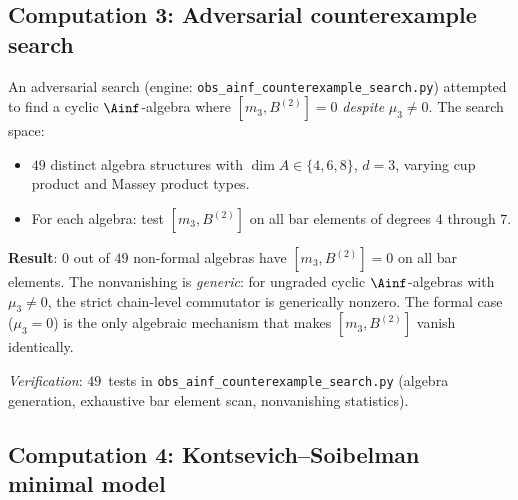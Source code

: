 \subsection{Computation 3: Adversarial counterexample search}
\label{subsec:comp-counterexample}

\begin{computation}[{Counterexample search for $[m_3, B^{(2)}] = 0$}]
\label{comp:counterexample}
An adversarial search (engine:
\texttt{obs\_ainf\_counterexample\_search.py}) attempted to find
a cyclic $\Ainf$-algebra where $[m_3, B^{(2)}] = 0$
\emph{despite} $\mu_3 \neq 0$.  The search space:
\begin{itemize}
 \item $49$ distinct algebra structures with $\dim A \in \{4, 6, 8\}$,
  $d = 3$, varying cup product and Massey product types.
 \item For each algebra: test $[m_3, B^{(2)}]$ on all bar
  elements of degrees $4$ through $7$.
\end{itemize}

\textbf{Result}: $0$ out of $49$ non-formal algebras have
$[m_3, B^{(2)}] = 0$ on all bar elements.  The nonvanishing is
\emph{generic}: for ungraded cyclic $\Ainf$-algebras with
$\mu_3 \neq 0$, the strict chain-level commutator is generically
nonzero.  The formal case ($\mu_3 = 0$) is the only
algebraic mechanism that makes $[m_3, B^{(2)}]$ vanish
identically.

\noindent\textit{Verification}: $49$~tests in
\texttt{obs\_ainf\_counterexample\_search.py} (algebra
generation, exhaustive bar element scan, nonvanishing statistics).
\end{computation}


\subsection{Computation 4: Kontsevich--Soibelman minimal model}
\label{subsec:comp-ks}

